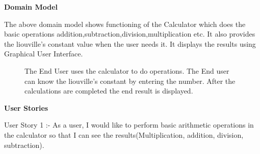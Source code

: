 \documentclass[12pt]{article}
\begin{document}
\vspace{\baselineskip}
\printbibliography
\newpage
{\Large \textbf{Domain Model}}\vspace{1em}
\begin{figure}[!http]
    \centering
\end{figure}
\newline
\newline
\newline
The above domain model shows functioning of the Calculator which does the basic operations addition,subtraction,division,multiplication etc. It also provides the liouville's constant value when the user needs it.\newline
\newline
It displays the results using Graphical User Interface.\newline
\newline
{}\vspace{1em}
\begin{figure}[!http]
    \centering
\end{figure}
\vspace{1em}
\begin{figure}[!http]
    \centering
    \newline
    \newline
    \newline
    The End User uses the calculator to do operations. The End user can know the liouville's constant by entering the number.  After the calculations are completed the end result is displayed.
\end{figure}
\newpage
\begin{rSection}
{\Large \textbf{User Stories}}\vspace{1em}
\end{rSection}
\newline
\newline
User Story 1 :- As a user, I would like to perform basic arithmetic operations in the calculator so that I can see the results(Multiplication, addition, division, subtraction).
\newline
\newline
\newline
\end{document}
